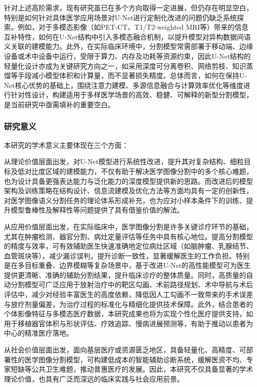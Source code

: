 针对上述高阶需求，现有研究虽已在多个方向取得一定进展，但仍存在明显空白，特别是如何针对具体医学应用场景对U-Net进行定制化改进的问题仍缺乏系统探索\cite{krithikaaliasanbudevi2022}。例如，对于多模态影像（如PET-CT、T1/T2-weighted MRI等）带来的信息互补特性，如何在U-Net结构中引入多模态融合机制，以提升模型对异构数据间语义关联的建模能力。此外，在实际临床环境中，分割模型常需部署于移动端、边缘设备或术中设备中运行，受限于算力、内存及功耗等资源约束，因此U-Net结构的轻量化设计亦成为关键研究方向之一，如采用深度可分离卷积、网络剪枝、知识蒸馏等手段减小模型体积和计算量，而不显著损失精度。总体而言，如何在保持U-Net核心优势的基础上，围绕注意力建模、多源信息融合与计算效率优化等维度进行针对性设计，构建适用于多样医学场景的高效、稳健、可解释的新型分割模型，是当前研究中亟需填补的重要空白。

\subsubsection{研究意义}

本研究的学术意义主要体现在三个方面：

从理论价值层面出发，对U-Net模型进行系统性改进，提升其对复杂结构、细粒目标及低对比度区域的建模能力，不仅有助于解决医学图像分割中的多个核心难题，也为设计具备更强表达能力与泛化能力的深度模型提供新的思路。而改进后的模型架构及训练策略在结构设计、信息流建模及优化方法等方面均具有一定的创新性，对医学图像语义分割任务的理论体系形成补充，也为应对小样本条件下的训练、提升模型鲁棒性及解释性等问题提供了具有借鉴价值的解法。

从应用价值层面出发，在实际临床中，医学图像分割是许多关键诊疗环节的基础，尤其在肿瘤检测、器官分割、病灶定量评估等任务中具有核心地位。提高分割模型的精度与效率，可有效辅助医生快速准确地定位病灶区域（如脑肿瘤、乳腺结节、血管斑块等），减少漏诊误判，提升诊断一致性，显著缓解医生的工作负担。特别是在多目标重叠、边界模糊等复杂场景中，基于改进U-Net的高性能模型可为医生提供更清晰、准确的辅助分割结果，提升临床诊疗的整体质量。同时，高质量的自动分割模型可广泛应用于放射治疗中的靶区勾画、术前路径规划、术中导航与术后评估中，减少对经验丰富医生的高度依赖，降低因人工勾画不一致带来的手术误差与放疗剂量偏差，为治疗过程的标准化与精细化提供技术保障。此外，结合患者的个体影像特征与多模态医疗数据，本研究成果也将为实现个性化医疗提供支持，如用于移植器官体积与形状评估、疗效追踪、慢病进展预测等，有助于推动以患者为中心的精准医疗落地。

从社会价值层面出发，面向基层医疗或资源匮乏地区，具备轻量化、高精度、可部署性的医学图像分割模型，可构建低成本的智能辅助诊断系统，缓解医资不均、专家短缺等公共卫生难题，推动普惠医疗的发展。因此，本研究不仅具备显著的学术理论价值，也具有广泛而深远的临床实践与社会应用前景。


